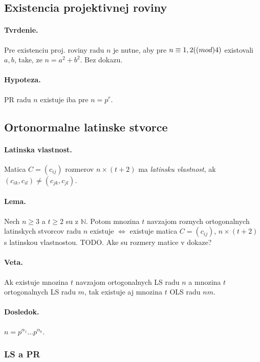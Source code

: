 \documentclass[10pt,a4paper]{article}
\begin{document}
\subsection{Existencia projektivnej roviny}
\paragraph{Tvrdenie.}
Pre existenciu proj. roviny radu $n$ je nutne, aby pre $n \equiv 1,2 (\textrm(mod) 4)$ existovali $a,b$, take, ze $n = a^2+b^2$. Bez dokazu. 

\paragraph{Hypoteza.}
PR radu $n$ existuje iba pre $n=p^r$. 

\subsection{Ortonormalne latinske stvorce}
\paragraph{Latinska vlastnost.}
Matica $C=(c_{ij})$ rozmerov $n \times (t+2)$ ma \emph{latinsku vlastnost}, ak $(c_{ik}, c_{il}) \neq (c_{jk}, c_{jl})$. 
\paragraph{Lema.}
Nech $n \geq 3$ a $t \geq 2$ su z $\mathbb{N}$. Potom mnozina $t$ navzajom roznych ortogonalnych latinskych stvorcov radu $n$ existuje $\Leftrightarrow$ existuje matica $C=(c_{ij})$, $n\times (t+2)$ s latinskou vlastnostou. 
TODO. Ake su rozmery matice v dokaze? 

\paragraph{Veta.}
Ak existuje mnozina $t$ navzajom ortogonalnych LS radu $n$ a mnozina $t$ ortogonalnych LS radu $m$, tak existuje aj mnozina $t$ OLS radu $nm$.

\paragraph{Dosledok.} $n = p^{\alpha_1} \ldots p^{\alpha_k}$.

\subsubsection{LS a PR}
\end{document}
